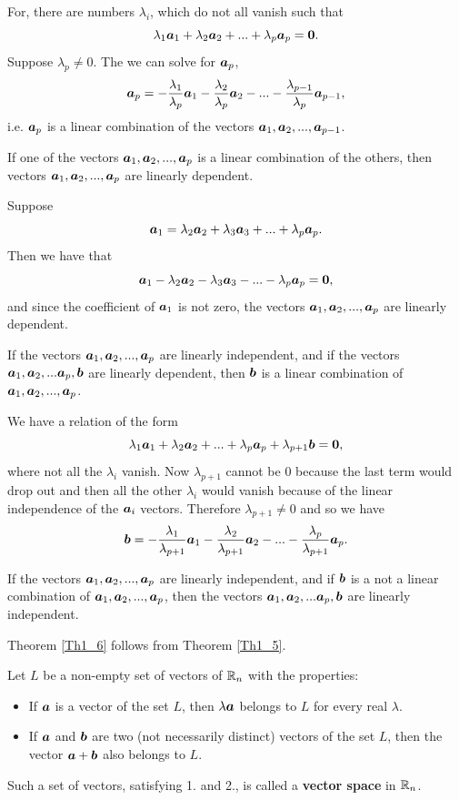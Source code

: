 For, there are numbers $\lambda_i$, which do not all vanish such that $$\lambda_1 \boldsymbol{a}_1 + \lambda_2 \boldsymbol{a}_2 +...+ \lambda_p \boldsymbol{a}_p = \bf 0.$$ Suppose $\lambda_p \ne 0$. The we can solve for $\boldsymbol{a}_p$,
$$\boldsymbol{a}_p = -{\lambda_1\over \lambda_p}\boldsymbol{a}_1 -{\lambda_2\over \lambda_p}\boldsymbol{a}_2 - ... - {\lambda_{p-1}\over \lambda_p} \boldsymbol{a}_{p-1},$$ i.e. $\boldsymbol{a}_p$ is a linear combination of the vectors $\boldsymbol{a}_1, \boldsymbol{a}_2, ..., \boldsymbol{a}_{p-1}$.  

\begin{theorem}
If one of the vectors $\boldsymbol{a}_1, \boldsymbol{a}_2, ..., \boldsymbol{a}_p$ is a linear combination of the others, then vectors $\boldsymbol{a}_1,\boldsymbol{a}_2,...,\boldsymbol{a}_p$ are linearly dependent.\label{Th1_4}
\end{theorem}

Suppose $$\boldsymbol{a}_1 = \lambda_2 \boldsymbol{a}_2 + \lambda_3 \boldsymbol{a}_3 +... + \lambda_p \boldsymbol{a}_p.$$ Then we have that 
$$\boldsymbol{a}_1 - \lambda_2 \boldsymbol{a}_2 - \lambda_3 \boldsymbol{a}_3 -... - \lambda_p \boldsymbol{a}_p = \bf 0,$$ and since the coefficient of $\boldsymbol{a}_1$ is not zero, the vectors $\boldsymbol{a}_1, \boldsymbol{a}_2, ... , \boldsymbol{a}_p$ are linearly dependent. 

\begin{theorem}
If the vectors $\boldsymbol{a}_1, \boldsymbol{a}_2, ..., \boldsymbol{a}_p$ are linearly independent, and if the vectors $\boldsymbol{a}_1, \boldsymbol{a}_2,...\boldsymbol{a}_p,\boldsymbol{b}$ are linearly dependent, then $\boldsymbol{b}$ is a linear
combination of $\boldsymbol{a}_1, \boldsymbol{a}_2, ..., \boldsymbol{a}_p$.\label{Th1_5}
\end{theorem}

We have a relation of the form $$\lambda_1 \boldsymbol{a}_1 + \lambda_2 \boldsymbol{a}_2 +... + \lambda_p \boldsymbol{a}_p + \lambda_{p+1} \boldsymbol{b} =\bf 0,$$ where not all the $\lambda_i$ vanish. Now
$\lambda_{p+1}$ cannot be 0 because the last term would drop out and then all the other $\lambda_i$ would vanish because of the linear independence of the $\boldsymbol{a}_i$ vectors. Therefore
$\lambda_{p+1} \ne 0$ and so we have 
$$\boldsymbol{b} = -{\lambda_1\over \lambda_{p+1}}\boldsymbol{a}_1 -{\lambda_2\over \lambda_{p+1}}\boldsymbol{a}_2 - ... - {\lambda_p\over \lambda_{p+1}} \boldsymbol{a}_p.$$


\begin{theorem}
If the vectors $\boldsymbol{a}_1, \boldsymbol{a}_2, ..., \boldsymbol{a}_p$ are linearly independent, and if $\boldsymbol{b}$ is a not a linear combination of $\boldsymbol{a}_1, \boldsymbol{a}_2, ..., \boldsymbol{a}_p$, then the vectors
$\boldsymbol{a}_1, \boldsymbol{a}_2,...\boldsymbol{a}_p,\boldsymbol{b}$ are linearly independent.\label{Th1_6}
\end{theorem}

Theorem \ref{Th1_6} follows from Theorem \ref{Th1_5}.

Let $L$ be a {\elevenit non-empty} set of vectors of $\mathbb{R}_n$ with the properties:
\begin{itemize}
\item[1.] If $\boldsymbol{a}$ is a vector of the set $L$, then $\lambda \boldsymbol{a}$ belongs to $L$ for every real $\lambda$.
\item[2.] If $\boldsymbol{a}$ and $\boldsymbol{b}$ are two (not necessarily distinct) vectors of the set $L$, then the vector $\boldsymbol{a} +\boldsymbol{b}$ also belongs to $L$.
\end{itemize}
Such a set of vectors, satisfying 1. and 2., is  called a {\bf vector space} in $\mathbb{R}_n$.

